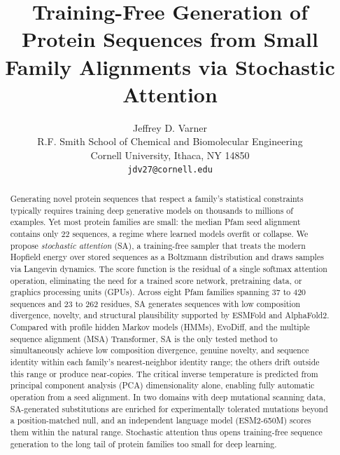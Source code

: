 \documentclass{article}
\title{Training-Free Generation of Protein Sequences from Small Family Alignments via Stochastic Attention}
\author{%
  Jeffrey D. Varner \\
  R.F. Smith School of Chemical and Biomolecular Engineering\\
  Cornell University, Ithaca, NY 14850 \\
  \texttt{jdv27@cornell.edu} \\
}
\theoremstyle{definition}
\theoremstyle{remark}
\begin{document}
\maketitle

\begin{abstract}
Generating novel protein sequences that respect a family's statistical constraints typically requires training deep generative models on thousands to millions of examples. Yet most protein families are small: the median Pfam seed alignment contains only 22 sequences, a regime where learned models overfit or collapse. We propose \emph{stochastic attention} (SA), a training-free sampler that treats the modern Hopfield energy over stored sequences as a Boltzmann distribution and draws samples via Langevin dynamics. The score function is the residual of a single softmax attention operation, eliminating the need for a trained score network, pretraining data, or graphics processing units (GPUs). Across eight Pfam families spanning 37 to 420 sequences and 23 to 262 residues, SA generates sequences with low composition divergence, novelty, and structural plausibility supported by ESMFold and AlphaFold2. Compared with profile hidden Markov models (HMMs), EvoDiff, and the multiple sequence alignment (MSA) Transformer, SA is the only tested method to simultaneously achieve low composition divergence, genuine novelty, and sequence identity within each family's nearest-neighbor identity range; the others drift outside this range or produce near-copies. The critical inverse temperature is predicted from principal component analysis (PCA) dimensionality alone, enabling fully automatic operation from a seed alignment. In two domains with deep mutational scanning data, SA-generated substitutions are enriched for experimentally tolerated mutations beyond a position-matched null, and an independent language model (ESM2-650M) scores them within the natural range. Stochastic attention thus opens training-free sequence generation to the long tail of protein families too small for deep learning.
\end{abstract}

\bigskip
\noindent{}
\bigskip
\end{document}
